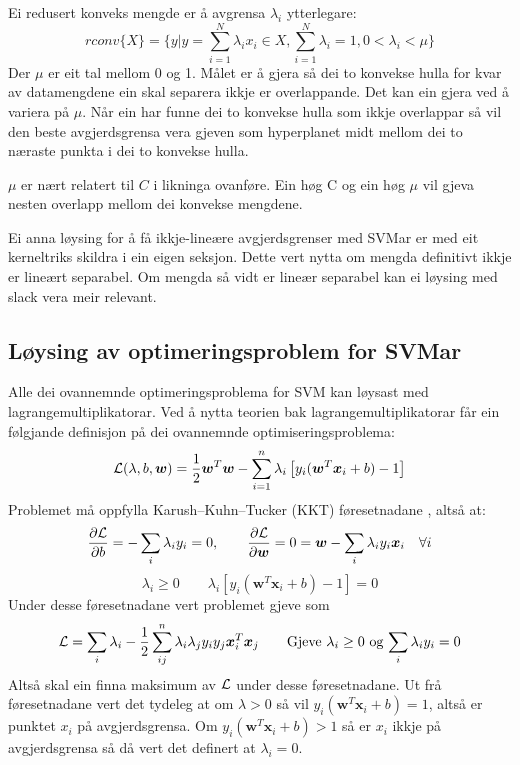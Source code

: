 \documentclass[oneside, nynorsk]{book}
\begin{document}
Ei redusert konveks mengde er å avgrensa $\lambda_i$ ytterlegare:
\[rconv\{X\}=\{ y | y=\sum_{i=1}^N \lambda_i x_i \in X, \sum_{i=1}^N \lambda_i=1, 0<\lambda_i<\mu\}\]
Der $\mu$ er eit tal mellom 0 og 1. Målet er å gjera så dei to konvekse hulla for kvar av datamengdene ein skal separera
ikkje er overlappande. Det kan ein gjera ved å variera på $\mu$. Når ein har funne dei to konvekse hulla som ikkje overlappar
så vil den beste avgjerdsgrensa vera gjeven som hyperplanet midt mellom dei to næraste punkta i dei to konvekse hulla.

$\mu$ er nært relatert til $C$ i likninga ovanføre. Ein høg C og ein høg $\mu$ vil gjeva nesten overlapp mellom dei konvekse mengdene.

Ei anna løysing for å få ikkje-lineære avgjerdsgrenser med SVMar er med eit kerneltriks skildra i ein eigen seksjon.
Dette vert nytta om mengda definitivt ikkje er lineært separabel.
Om mengda så vidt er lineær separabel kan ei løysing med slack vera meir relevant.
\subsection{Løysing av optimeringsproblem for SVMar}
Alle dei ovannemnde optimeringsproblema for SVM kan løysast med lagrangemultiplikatorar.
Ved å nytta teorien bak lagrangemultiplikatorar får ein følgjande definisjon på dei ovannemnde optimiseringsproblema:
\[{\cal L}(\lambda,b,\boldsymbol{w})=\frac{1}{2}\boldsymbol{w}^T\boldsymbol{w}-\sum_{i=1}^n\lambda_i\left[y_i(\boldsymbol{w}^T\boldsymbol{x}_i+b)-1\right]\]
Problemet må oppfylla Karush–Kuhn–Tucker (KKT) føresetnadane \cite{Sergios}, altså at:
\[\frac{\partial {\cal L}}{\partial b} = -\sum_{i} \lambda_iy_i=0, \qquad \frac{\partial {\cal L}}{\partial \boldsymbol{w}} = 0 = \boldsymbol{w}-\sum_{i} \lambda_iy_i\boldsymbol{x}_i \quad \forall i\]
\[\lambda_i \geq 0 \qquad \lambda_i\left[y_i(\boldsymbol{w}^T\boldsymbol{x}_i+b)-1\right]=0 \]
Under desse føresetnadane vert problemet gjeve som
\[{\cal L}=\sum_i\lambda_i-\frac{1}{2}\sum_{ij}^n\lambda_i\lambda_jy_iy_j\boldsymbol{x}_i^T\boldsymbol{x}_j \qquad \text{Gjeve $\lambda_i\geq 0$ og $\sum_i\lambda_iy_i=0$}\]
Altså skal ein finna maksimum av ${\cal L}$ under desse føresetnadane.
Ut frå føresetnadane vert det tydeleg at om $\lambda > 0$ så vil $y_i(\boldsymbol{w}^T\boldsymbol{x}_i+b)=1$, altså er punktet $x_i$ på avgjerdsgrensa.
Om $y_i(\boldsymbol{w}^T\boldsymbol{x}_i+b)> 1$ så er $x_i$ ikkje på avgjerdsgrensa så då vert det definert at $\lambda_i=0$.
\end{document}
